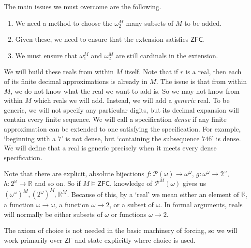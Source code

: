 The main issues we must overcome are the following.
\begin{enumerate}
    \item We need a method to choose the \( \omega_2^M \)-many subsets of \( M \) to be added.
    \item Given these, we need to ensure that the extension satisfies \( \mathsf{ZFC} \).
    \item We must ensure that \( \omega_1^M \) and \( \omega_2^M \) are still cardinals in the extension.
\end{enumerate}
We will build these reals from within \( M \) itself.
Note that if \( r \) is a real, then each of its finite decimal approximations is already in \( M \).
The issue is that from within \( M \), we do not know what the real we want to add is.
So we may not know from within \( M \) which reals we will add.
Instead, we will add a \emph{generic} real.
To be generic, we will not specify any particular digits, but its decimal expansion will contain every finite sequence.
We will call a specification \emph{dense} if any finite approximation can be extended to one satisfying the specification.
For example, `beginning with a \( 7 \)' is not dense, but `containing the subsequence \( 746 \)' is dense.
We will define that a real is generic precisely when it meets every dense specification.

Note that there are explicit, absolute bijections \( f : \mathcal P(\omega) \to \omega^\omega \), \( g : \omega^\omega \to 2^\omega \), \( h : 2^\omega \to \mathbb R \) and so on.
So if \( M \vDash \mathsf{ZFC} \), knowledge of \( \mathcal P^M(\omega) \) gives us \( (\omega^\omega)^M, (2^\omega)^M, \mathbb R^M \).
Because of this, by a `real' we mean either an element of \( \mathbb R \), a function \( \omega \to \omega \), a function \( \omega \to 2 \), or a subset of \( \omega \).
In formal arguments, reals will normally be either subsets of \( \omega \) or functions \( \omega \to 2 \).

The axiom of choice is not needed in the basic machinery of forcing, so we will work primarily over \( \mathsf{ZF} \) and state explicitly where choice is used.

